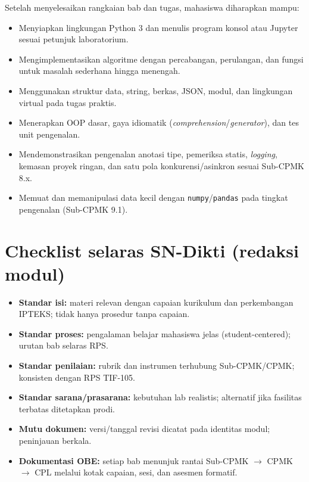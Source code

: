 \documentclass[../main.tex]{subfiles}
\begin{document}
Setelah menyelesaikan rangkaian bab dan tugas, mahasiswa diharapkan mampu:

\begin{itemize}[leftmargin=*]
  \item Menyiapkan lingkungan Python 3 dan menulis program konsol atau Jupyter sesuai petunjuk laboratorium.
  \item Mengimplementasikan algoritme dengan percabangan, perulangan, dan fungsi untuk masalah sederhana hingga menengah.
  \item Menggunakan struktur data, string, berkas, JSON, modul, dan lingkungan virtual pada tugas praktis.
  \item Menerapkan OOP dasar, gaya idiomatik (\textit{comprehension}/\textit{generator}), dan tes unit pengenalan.
  \item Mendemonstrasikan pengenalan anotasi tipe, pemeriksa statis, \textit{logging}, kemasan proyek ringan, dan satu pola konkurensi/asinkron sesuai Sub-CPMK 8.x.
  \item Memuat dan memanipulasi data kecil dengan \texttt{numpy}/\texttt{pandas} pada tingkat pengenalan (Sub-CPMK 9.1).
\end{itemize}

\section{Checklist selaras SN-Dikti (redaksi modul)}

\begin{itemize}[leftmargin=*]
  \item \textbf{Standar isi:} materi relevan dengan capaian kurikulum dan perkembangan IPTEKS; tidak hanya prosedur tanpa capaian.
  \item \textbf{Standar proses:} pengalaman belajar mahasiswa jelas (student-centered); urutan bab selaras RPS.
  \item \textbf{Standar penilaian:} rubrik dan instrumen terhubung Sub-CPMK/CPMK; konsisten dengan RPS TIF-105.
  \item \textbf{Standar sarana/prasarana:} kebutuhan lab realistis; alternatif jika fasilitas terbatas ditetapkan prodi.
  \item \textbf{Mutu dokumen:} versi/tanggal revisi dicatat pada identitas modul; peninjauan berkala.
  \item \textbf{Dokumentasi OBE:} setiap bab menunjuk rantai Sub-CPMK $\rightarrow$ CPMK $\rightarrow$ CPL melalui kotak capaian, sesi, dan asesmen formatif.
\end{itemize}
\end{document}

